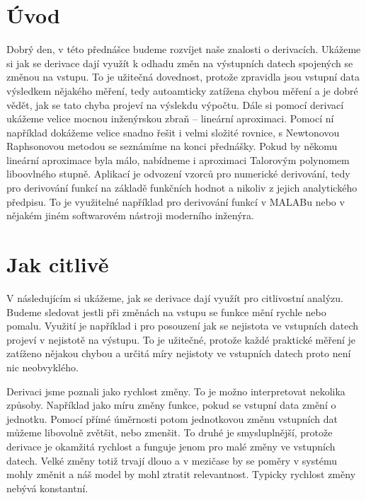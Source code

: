 \documentclass[12pt]{article}
\begin{document}
\section*{Úvod}

Dobrý den, v této přednášce budeme rozvíjet naše znalosti o derivacích. Ukážeme si jak se derivace dají využít k odhadu změn na výstupních datech spojených se změnou na vstupu. To je užitečná dovednost, protože zpravidla jsou vstupní data výsledkem nějakého měření, tedy autoamticky zatížena chybou měření a je dobré vědět, jak se tato chyba projeví na výslekdu výpočtu. Dále si pomocí derivací ukážeme velice mocnou inženýrskou zbraň -- lineární aproximaci. Pomocí ní například dokážeme velice snadno řešit i velmi složité rovnice, s Newtonovou Raphsonovou metodou se seznámíme na konci přednášky. Pokud by někomu lineární aproximace byla málo, nabídneme i aproximaci Talorovým polynomem liboovlného stupně. Aplikací je odvození vzorců pro numerické derivování, tedy pro derivování funkcí na základě funkčních hodnot a nikoliv z jejich analytického předpisu. To je využitelné například pro derivování funkcí v MALABu nebo v nějakém jiném softwarovém nástroji moderního inženýra. 

\section*{Jak citlivě}

V následujícím si ukážeme, jak se derivace dají využít pro citlivostní analýzu. Budeme sledovat jestli při změnách na vstupu se funkce mění rychle nebo pomalu. Využití je například i pro posouzení jak se nejistota ve vstupních datech projeví v nejistotě na výstupu. To je užitečné, protože každé praktické měření je zatíženo nějakou chybou a určitá míry nejistoty ve vstupních datech proto není nic neobvyklého.

Derivaci jsme poznali jako rychlost změny. To je možno interpretovat nekolika způsoby. Například jako míru změny funkce, pokud se vstupní data změní o jednotku. Pomocí přímé úměrnosti potom jednotkovou změnu vstupních dat můžeme libovolně zvětšit, nebo zmenšit. To druhé je smysluplnější, protože derivace je okamžitá rychlost a funguje jenom pro malé změny ve vstupních datech. Velké změny totiž trvají dlouo a v mezičase by se poměry v systému mohly změnit a náš model by mohl ztratit relevantnost. Typicky rychlost změny nebývá konstantní.
\end{document}
